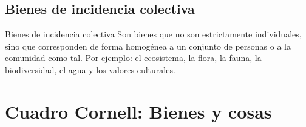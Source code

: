 \documentclass[12pt,oneside]{book}
\begin{document}
\subsection{Bienes de incidencia colectiva}

\begin{definition}{Bienes de incidencia colectiva}
Son bienes que no son estrictamente individuales, sino que corresponden de forma homogénea a un conjunto de personas o a la comunidad como tal. Por ejemplo: el ecosistema, la flora, la fauna, la biodiversidad, el agua y los valores culturales.
\end{definition}

\section{Cuadro Cornell: Bienes y cosas}
\end{document}
